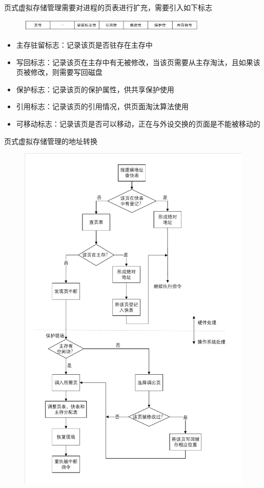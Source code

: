 \documentclass[cs4size,a4paper,10pt]{ctexart}
\begin{document}
		页式虚拟存储管理需要对进程的页表进行扩充，需要引入如下标志
		\begin{figure}[H]
			\centering
			\includegraphics[width=0.8\textwidth]{img/3.3.4.1}
		\end{figure}
		\begin{itemize}
			\item 主存驻留标志：记录该页是否驻存在主存中
			\item 写回标志：记录该页在主存中有无被修改，当该页需要从主存淘汰，且如果该页被修改，则需要写回磁盘
			\item 保护标志：记录该页的保护属性，供共享保护使用
			\item 引用标志：记录该页的引用情况，供页面淘汰算法使用
			\item 可移动标志：记录该页是否可以移动，正在与外设交换的页面是不能被移动的
		\end{itemize}
		页式虚拟存储管理的地址转换
		\begin{figure}[H]
			\centering
			\includegraphics[height=0.55\textheight]{img/3.3.4}
		\end{figure}
\end{document}
